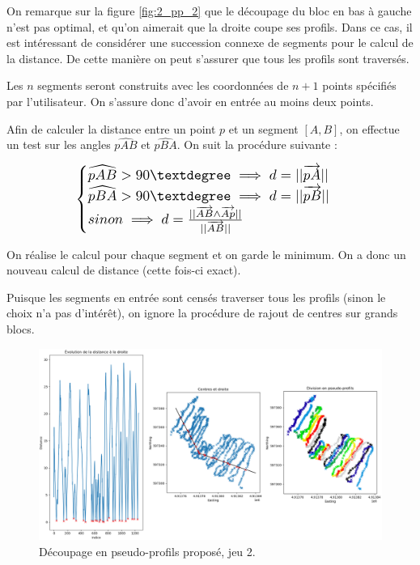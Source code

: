 \documentclass[12pt]{article}
\begin{document}
    On remarque sur la figure \ref{fig:2_pp_2} que le découpage du bloc en bas à gauche n'est pas optimal, et qu'on aimerait que la droite coupe ses profils. Dans ce cas, il est intéressant de considérer une succession connexe de segments pour le calcul de la distance. De cette manière on peut s'assurer que tous les profils sont traversés.

    Les $n$ segments seront construits avec les coordonnées de $n+1$ points spécifiés par l'utilisateur. On s'assure donc d'avoir en entrée au moins deux points.

    Afin de calculer la distance entre un point $p$ et un segment $[A,B]$, on effectue un test sur les angles $\widehat{pAB}$ et $\widehat{pBA}$. On suit la procédure suivante :

    \begin{spacing}{1}
        \begin{equation}
            \scalebox{1.25}{$
            \begin{cases}
                \widehat{pAB} > 90° \implies d = ||\overrightarrow{pA}|| \\
                \widehat{pBA} > 90° \implies d = ||\overrightarrow{pB}|| \\
                sinon \implies d = \frac{||\overrightarrow{AB}\land\overrightarrow{Ap}||}{||\overrightarrow{AB}||}
            \end{cases}
            $}
        \end{equation}
    \end{spacing}

    On réalise le calcul pour chaque segment et on garde le minimum. On a donc un nouveau calcul de distance (cette fois-ci exact).

    Puisque les segments en entrée sont censés traverser tous les profils (sinon le choix n'a pas d'intérêt), on ignore la procédure de rajout de centres sur grands blocs.

    \begin{figure}[ht!]
        \centering
        \includegraphics[width=\textwidth]{Images/PseudoProf_full_2_seg.png}  
        \caption{Découpage en pseudo-profils proposé, jeu 2.}
        \label{fig:2_pp_2_seg}
    \end{figure}
\end{document}
